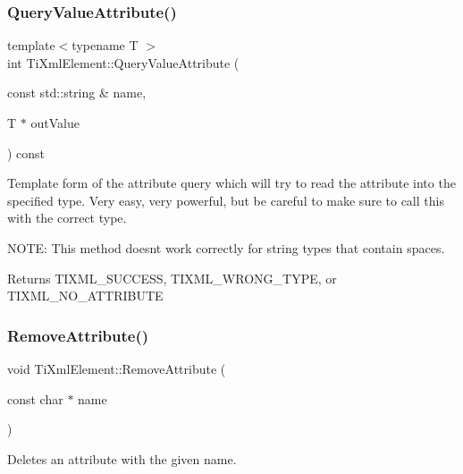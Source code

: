 \subsubsection{\texorpdfstring{Query\+Value\+Attribute()}{QueryValueAttribute()}}
{\footnotesize\ttfamily template$<$typename T $>$ \\
int Ti\+Xml\+Element\+::\+Query\+Value\+Attribute (\begin{DoxyParamCaption}\item[{const std\+::string \&}]{name,  }\item[{T $\ast$}]{out\+Value }\end{DoxyParamCaption}) const\hspace{0.3cm}{\ttfamily [inline]}}

Template form of the attribute query which will try to read the attribute into the specified type. Very easy, very powerful, but be careful to make sure to call this with the correct type.

N\+O\+TE\+: This method doesn\textquotesingle{}t work correctly for \textquotesingle{}string\textquotesingle{} types that contain spaces.

\begin{DoxyReturn}{Returns}
T\+I\+X\+M\+L\+\_\+\+S\+U\+C\+C\+E\+SS, T\+I\+X\+M\+L\+\_\+\+W\+R\+O\+N\+G\+\_\+\+T\+Y\+PE, or T\+I\+X\+M\+L\+\_\+\+N\+O\+\_\+\+A\+T\+T\+R\+I\+B\+U\+TE 
\end{DoxyReturn}
\hypertarget{class_ti_xml_element_a56979767deca794376b1dfa69a525b2a}{}\label{class_ti_xml_element_a56979767deca794376b1dfa69a525b2a} 
\subsubsection{\texorpdfstring{Remove\+Attribute()}{RemoveAttribute()}}
{\footnotesize\ttfamily void Ti\+Xml\+Element\+::\+Remove\+Attribute (\begin{DoxyParamCaption}\item[{const char $\ast$}]{name }\end{DoxyParamCaption})}

Deletes an attribute with the given name. \hypertarget{class_ti_xml_element_abf0b3bd7f0e4c746a89ec6e7f101fc32}{}\label{class_ti_xml_element_abf0b3bd7f0e4c746a89ec6e7f101fc32} 
